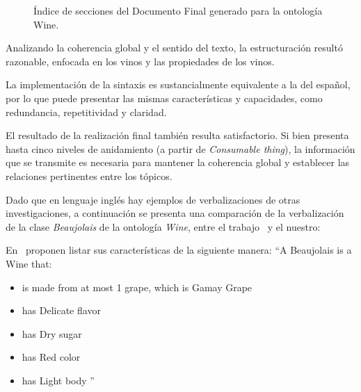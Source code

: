 \begin{figure}
\begin{multicols}{2}
{\small
\begin{figure}[H]
\end{figure}}  

\begin{figure}[H]
\end{figure}

\end{multicols}
\caption{Índice de secciones del Documento Final generado para la ontología Wine.}
\label{fig:indice_secciones_wine}
\end{figure}

Analizando la coherencia global y el sentido del texto, la estructuración resultó razonable, enfocada en los vinos y las propiedades de los vinos.

La implementación de la sintaxis es sustancialmente equivalente a la del español, por lo que puede presentar las mismas características y capacidades, como redundancia, repetitividad y claridad. 

El resultado de la realización final también resulta satisfactorio. Si bien presenta hasta cinco niveles de anidamiento (a partir de \emph{Consumable thing}), la información que se transmite es necesaria para mantener la coherencia global y establecer las relaciones pertinentes entre los tópicos.

Dado que en lenguaje inglés hay ejemplos de verbalizaciones de otras investigaciones, a continuación se presenta una comparación de la verbalización de la clase \emph{Beaujolais} de la ontología \emph{Wine}, entre el trabajo~\cite{hewlett2005effective} y el nuestro:

En~\cite{hewlett2005effective} proponen listar sus características de la siguiente manera: 
``A Beaujolais is a Wine that:
\begin{itemize}
    \item is made from at most 1 grape, which is Gamay Grape
    \item has Delicate flavor
    \item has Dry sugar 
    \item has Red color
    \item has Light body ''
\end{itemize}

